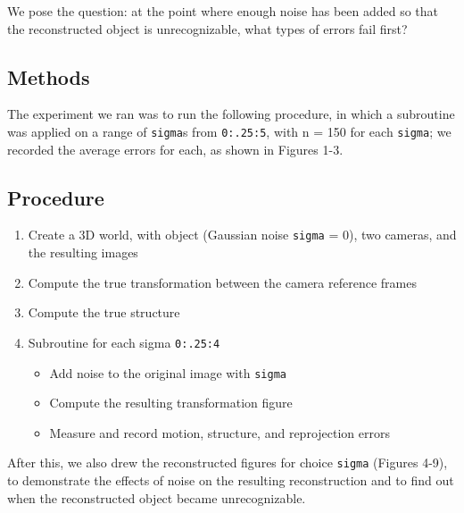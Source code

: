\documentclass{article}
\begin{document}
We pose the question: at the point where enough noise has been added so that the reconstructed object is unrecognizable, what types of errors fail first?




\subsection{Methods}

The experiment we ran was to run the following procedure, in which a subroutine was applied on a range of \texttt{sigma}s from \texttt{0:.25:5}, with n = 150 for each \texttt{sigma}; we recorded the average errors for each, as shown in Figures 1-3.

\subsection*{Procedure}

\begin{enumerate}
  \item Create a 3D world, with object (Gaussian noise \texttt{sigma} = 0), two cameras, and the resulting images
  \item Compute the true transformation between the camera reference frames
  \item Compute the true structure
  \item Subroutine for each sigma \texttt{0:.25:4}
  \begin{itemize}
  	\item Add noise to the original image with \texttt{sigma}
  	\item Compute the resulting transformation figure
  	\item Measure and record motion, structure, and reprojection errors
  \end{itemize}
\end{enumerate} 

After this, we also drew the reconstructed figures for choice \texttt{sigma} (Figures 4-9), to demonstrate the effects of noise on the resulting reconstruction and to find out when the reconstructed object became unrecognizable.

\end{document}
